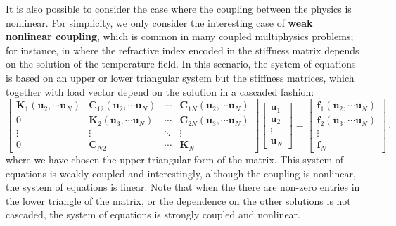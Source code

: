     It is also possible to consider the case where the coupling between the physics is 
    nonlinear. For simplicity, we only consider the interesting case of \textbf{weak nonlinear coupling},
    which is common in many
    coupled multiphysics problems; for instance, in \cite{ownpub0} where the refractive index encoded in 
    the stiffness matrix depends on the solution of the temperature field.
     In this scenario, the system of equations is based on an upper or lower triangular system but the stiffness matrices, which together
     with load vector depend 
     on the solution in a cascaded fashion:
     \begin{equation} \label{eq:multiphysics_weak_nonlinear}
        \begin{bmatrix}
            \mathbf{K}_1(\mathbf{u}_2, \cdots \mathbf{u}_N)    & \mathbf{C}_{12} (\mathbf{u}_2, \cdots \mathbf{u}_N)& \cdots & \mathbf{C}_{1N}(\mathbf{u}_2, \cdots \mathbf{u}_N) \\
            0 & \mathbf{K}_2 (\mathbf{u}_3, \cdots \mathbf{u}_N)   & \cdots & \mathbf{C}_{2N} (\mathbf{u}_3, \cdots \mathbf{u}_N)\\
            \vdots          & \vdots          & \ddots & \vdots          \\
            0& \mathbf{C}_{N2} & \cdots & \mathbf{K}_N
        \end{bmatrix}
        \begin{bmatrix}
            \mathbf{u}_1 \\
            \mathbf{u}_2 \\
            \vdots       \\
            \mathbf{u}_N
        \end{bmatrix}
        =
        \begin{bmatrix}
            \mathbf{f}_1 (\mathbf{u}_2, \cdots \mathbf{u}_N)\\
            \mathbf{f}_2 (\mathbf{u}_3, \cdots \mathbf{u}_N)\\
            \vdots       \\
            \mathbf{f}_N
        \end{bmatrix}\,.
    \end{equation}
    where we have chosen the upper triangular form of the matrix. This system of equations is weakly
    coupled and interestingly, although the coupling is nonlinear, the system of equations is linear.
    Note that when the there are non-zero entries in the lower triangle of the matrix, or the dependence on the
    other solutions is not cascaded, the system of equations is strongly coupled and nonlinear.

